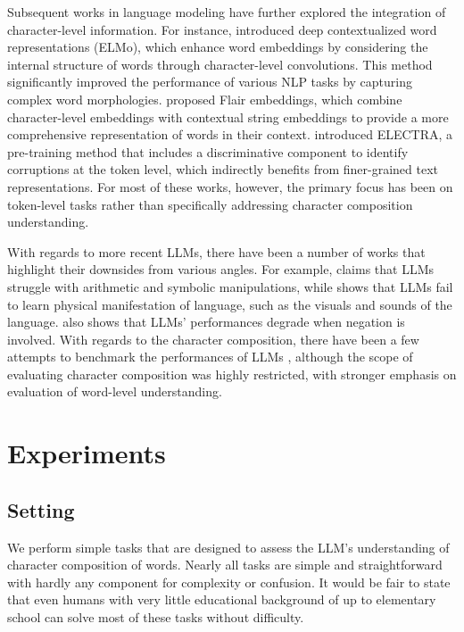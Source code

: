 \documentclass{article}
\theoremstyle{plain}
\theoremstyle{definition}
\theoremstyle{remark}
\begin{document}
Subsequent works in language modeling have further explored the integration of character-level information. For instance, \cite{Peters2018DeepCW} introduced deep contextualized word representations (ELMo), which enhance word embeddings by considering the internal structure of words through character-level convolutions. This method significantly improved the performance of various NLP tasks by capturing complex word morphologies. \cite{Akbik2019FLAIRAE} proposed Flair embeddings, which combine character-level embeddings with contextual string embeddings to provide a more comprehensive representation of words in their context. \cite{clark2020electra} introduced ELECTRA, a pre-training method that includes a discriminative component to identify corruptions at the token level, which indirectly benefits from finer-grained text representations. For most of these works, however, the primary focus has been on token-level tasks rather than specifically addressing character composition understanding. 

With regards to more recent LLMs, there have been a number of works that highlight their downsides from various angles. For example, \cite{Qian2022LimitationsOL} claims that LLMs struggle with arithmetic and symbolic manipulations, while \cite{Lee2024LanguageMD} shows that LLMs fail to learn physical manifestation of language, such as the visuals and sounds of the language. \cite{Truong2023LanguageMA} also shows that LLMs' performances degrade when negation is involved. With regards to the character composition, there have been a few attempts to benchmark the performances of LLMs \cite{Srivastava2022BeyondTI,Efrat2022LMentryAL}, although the scope of evaluating character composition was highly restricted, with stronger emphasis on evaluation of word-level understanding.

\section{Experiments}\label{sec:experiment}
\subsection{Setting}
We perform simple tasks that are designed to assess the LLM's understanding of character composition of words. Nearly all tasks are simple and straightforward with hardly any component for complexity or confusion. It would be fair to state that even humans with very little educational background of up to elementary school can solve most of these tasks without difficulty.
\end{document}

